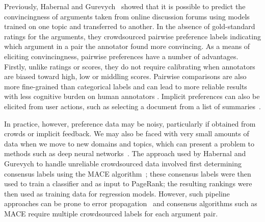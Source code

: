 Previously, Habernal and Gurevych~ showed that it is possible to predict  the
convincingness of arguments taken from online discussion forums %
using models trained on one topic and transferred to another.
In the absence of gold-standard ratings for the arguments,  
they crowdsourced pairwise preference labels indicating 
which argument in a pair the annotator found more convincing. 
As a means of eliciting convincingness, pairwise preferences have a number of advantages. 
Firstly, unlike ratings or scores, they do not require calibrating when annotators 
are biased toward high, low or middling scores.
Pairwise comparisons are also more fine-grained than categorical labels 
and can lead to more reliable results with less cognitive burden on human annotators
\cite{kendall1948rank,kingsley2006preference}. 
Implicit preferences can also be elicited from user actions, 
such as selecting a document from a list of summaries~\cite{joachims2002optimizing}.
  
In practice, however, preference data may be noisy, particularly if obtained from crowds or implicit feedback.
We may also be faced with very small amounts of data when we move to new domains and topics,
which can present a problem to methods such as deep neural networks~\cite{srivastava2014dropout}.
The approach used by Habernal and Gurevych  to handle unreliable 
crowdsourced data involved first determining consensus labels using the MACE algorithm~\cite{hovy2013learning};
these consensus labels were then used to train a classifier and as input to 
PageRank; the resulting rankings were then used as training data for regression models.
However, such pipeline approaches can be prone to error propagation~\cite{chen2016joint} 
and consensus algorithms such as MACE require multiple crowdsourced labels for each argument pair. 

